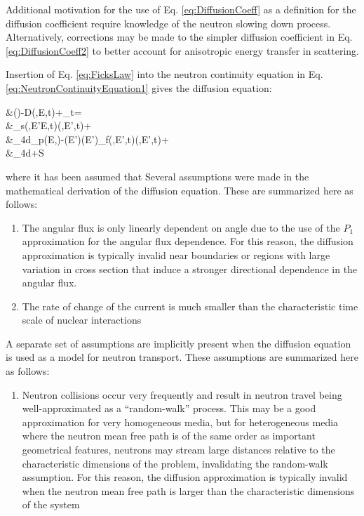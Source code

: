 Additional motivation for the use of Eq. \eqref{eq:DiffusionCoeff} as a definition for the diffusion coefficient require knowledge of the neutron slowing down process. Alternatively, corrections may be made to the simpler diffusion coefficient in Eq. \eqref{eq:DiffusionCoeff2} to better account for anisotropic energy transfer in scattering.

Insertion of Eq. \eqref{eq:FicksLaw} into the neutron continuity equation in Eq. \eqref{eq:NeutronContinuityEquation1} gives the diffusion equation:

\beqa
\label{eq:DiffusionEquation}
&\left(\right)-\nabla\cdot\left\lbrack D\nabla\phi(,E,t)\right\rbrack+\Sigma_t\sset\phi\sset=\\
&\hspace{1cm}\dEprime\Sigma_s(,E'\rightarrow E,t)\phi(,E',t)+\\
&\hspace{2cm}\int_{4\pi}d\hO\chi_p(E,\hO)\dEprime\left{}-\beta(E')\right\rbrack\nu(E')\Sigma_f(,E',t)\phi(,E',t)+\\
&\hspace{3cm}\int_{4\pi}d\hO\delayedfissionsource+S\sset
\eeqa

where it has been assumed that Several assumptions were made in the mathematical derivation of the diffusion equation. These are summarized here as follows:

\begin{enumerate}
\item The angular flux is only linearly dependent on angle due to the use of the \(P_1\) approximation for the angular flux dependence. For this reason, the diffusion approximation is typically invalid near boundaries or regions with large variation in cross section that induce a stronger directional dependence in the angular flux.
\item The rate of change of the current is much smaller than the characteristic time scale of nuclear interactions
\end{enumerate}

A separate set of assumptions are implicitly present when the diffusion equation is used as a model for neutron transport. These assumptions are summarized here as follows:

\begin{enumerate}
\item Neutron collisions occur very frequently and result in neutron travel being well-approximated as a ``random-walk'' process. This may be a good approximation for very homogeneous media, but for heterogeneous media where the neutron mean free path is of the same order as important geometrical features, neutrons may stream large distances relative to the characteristic dimensions of the problem, invalidating the random-walk assumption. For this reason, the diffusion approximation is typically invalid when the neutron mean free path is larger than the characteristic dimensions of the system %
\end{enumerate}

